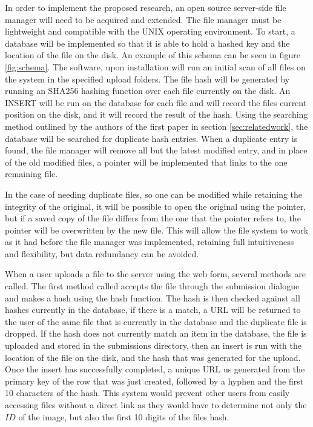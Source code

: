 \documentclass[11pt]{article}
\begin{document}
In order to implement the proposed research, an open source server-side file manager will need to be acquired and extended. The file manager must be lightweight and compatible with the UNIX operating environment. To start, a database will be implemented so that it is able to hold a hashed key and the location of the file on the disk. An example of this schema can be seen in figure \ref{fig:schema}. The software, upon installation will run an initial scan of all files on the system in the specified upload folders. The file hash will be generated by running an SHA256 hashing function over each file currently on the disk. An INSERT will be run on the database for each file and will record the files current position on the disk, and it will record the result of the hash. Using the searching method outlined by the authors of the first paper in section \ref{sec:relatedwork}, the database will be searched for duplicate hash entries. When a duplicate entry is found, the file manager will remove all but the latest modified entry, and in place of the old modified files, a pointer will be implemented that links to the one remaining file.

In the case of needing duplicate files, so one can be modified while retaining the integrity of the original, it will be possible to open the original using the pointer, but if a saved copy of the file differs from the one that the pointer refers to, the pointer will be overwritten by the new file. This will allow the file system to work as it had before the file manager was implemented, retaining full intuitiveness and flexibility, but data redundancy can be avoided.

When a user uploads a file to the server using the web form, several methods are called. The first method called accepts the file through the submission dialogue and makes a hash using the hash function. The hash is then checked against all hashes currently in the database, if there is a match, a URL will be returned to the user of the same file that is currently in the database and the duplicate file is dropped. If the hash does not currently match an item in the database, the file is uploaded and stored in the submissions directory, then an insert is run with the location of the file on the disk, and the hash that was generated for the upload. Once the insert has successfully completed, a unique URL us generated from the primary key of the row that was just created, followed by a hyphen and the first 10 characters of the hash. This system would prevent other users from easily accessing files without a direct link as they would have to determine not only the $ID$ of the image, but also the first 10 digits of the files hash.
\end{document}
